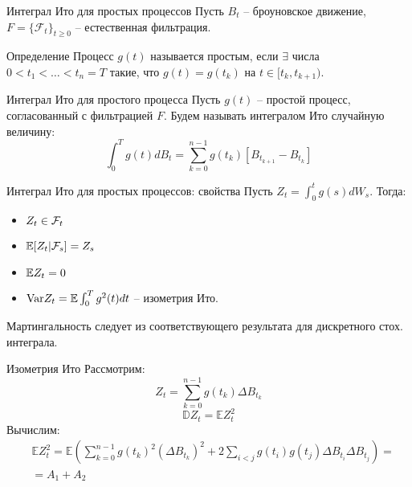 \documentclass{beamer}
\begin{document}
\begin{frame}{Интеграл Ито для простых процессов}
    Пусть $B_t$ -- броуновское движение, $F=\{\mathcal{F} _t\}_{t\geq 0}$ -- естественная фильтрация.

    \begin{block}{Определение}
        Процесс $g(t)$ называется простым, если $\exists$ числа $0 < t_1 < \ldots < t_n = T$ такие, что $g(t) = g(t_k)$ на $t \in [t_k, t_{k+1})$.
    \end{block}
     
    
    \begin{block}{Интеграл Ито для простого процесса}
        Пусть $g(t)$ -- простой процесс, согласованный с фильтрацией $F$. Будем называть интегралом Ито случайную величину:
        $$
            \int_0^T g(t) dB_t = \sum_{k=0}^{n-1} g(t_k)\left[B_{t_{k+1}} - B_{t_k}\right]
        $$
    \end{block}    
\end{frame}

\begin{frame}{Интеграл Ито для простых процессов: свойства}
    Пусть $Z_t = \int_0^t g(s) dW_s$. Тогда:
    \begin{itemize}
        \item $Z_t \in \mathcal{F}_t$
        \item $\mathbb{E} [Z_t | \mathcal{F}_s] = Z_s$
        \item $\mathbb{E} Z_t = 0$
        \item $\mathrm{Var} Z_t = \mathbb{E} \int_0^T g^2(t) dt$ -- изометрия Ито.
    \end{itemize}
    Мартингальность следует из соответствующего результата для дискретного стох. интеграла. 
\end{frame}

\begin{frame}{Изометрия Ито}
    Рассмотрим:
    $$
        Z_t = \sum_{k=0}^{n-1} g(t_k) \Delta B_{t_k}
    $$
    $$
        \mathbb{D} Z_t = \mathbb{E} Z_t^2
    $$
    Вычислим:
    \begin{align*}
        &\mathbb{E} Z_t^2 = \mathbb{E} \left(\sum_{k=0}^{n-1} g(t_k)^2 \left(\Delta B_{t_k}\right)^2 + 2 \sum_{i < j} g(t_i)g(t_j) \Delta B_{t_i} \Delta B_{t_j}\right) = \\
        &= A_1 + A_2
    \end{align*}
\end{frame}
\end{document}
